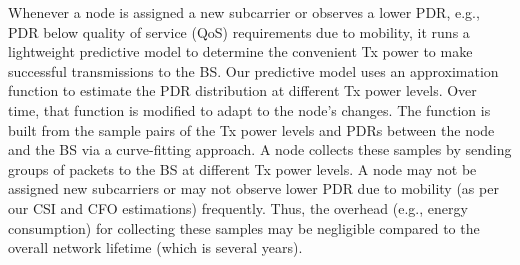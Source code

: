 Whenever a node is assigned a new subcarrier or observes a lower PDR, e.g., PDR below quality of service (QoS) requirements due to mobility, it runs a lightweight predictive model to determine the convenient Tx power to make successful transmissions to the BS.
Our predictive model uses an approximation function to estimate the PDR distribution at different Tx power levels. Over time, that function is modified to adapt to the node's changes. The function is built from the sample pairs of the Tx power levels and PDRs between the node and the BS via a curve-fitting approach. A node collects these samples by sending groups of packets to the BS at different Tx power levels. A node may not be assigned new subcarriers or may not observe lower PDR due to mobility (as per our CSI and CFO estimations) frequently. Thus, the overhead (e.g., energy consumption) for collecting these samples may be negligible compared to the overall network lifetime (which is several years).

